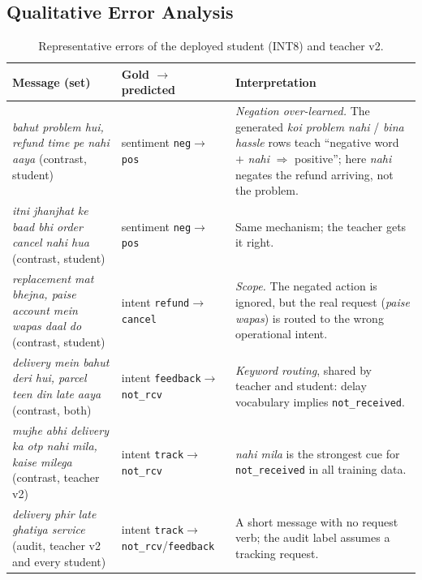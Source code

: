 \documentclass[11pt,a4paper]{article}
\theoremstyle{remark}
\newcommand{\lbl}[1]{\texttt{#1}}                      %
\newcommand{\hi}[1]{\textit{#1}}                       %
\begin{document}
\subsection{Qualitative Error Analysis}
\label{sec:v12errors}

\begin{table}[h]
\centering\small
\caption{Representative errors of the deployed student (INT8) and teacher v2.}
\label{tab:v12errors}
\begin{tabularx}{\linewidth}{@{}p{5.0cm} p{3.0cm} X@{}}
\toprule
Message (set) & Gold $\to$ predicted & Interpretation \\
\midrule
\hi{bahut problem hui, refund time pe nahi aaya} (contrast, student) &
sentiment \lbl{neg}$\to$\lbl{pos} &
\emph{Negation over-learned.} The generated \hi{koi problem nahi} / \hi{bina hassle} rows teach ``negative word $+$ \hi{nahi} $\Rightarrow$ positive''; here \hi{nahi} negates the refund arriving, not the problem. \\
\addlinespace
\hi{itni jhanjhat ke baad bhi order cancel nahi hua} (contrast, student) &
sentiment \lbl{neg}$\to$\lbl{pos} &
Same mechanism; the teacher gets it right. \\
\addlinespace
\hi{replacement mat bhejna, paise account mein wapas daal do} (contrast, student) &
intent \lbl{refund}$\to$\lbl{cancel} &
\emph{Scope.} The negated action is ignored, but the real request (\hi{paise wapas}) is routed to the wrong operational intent. \\
\addlinespace
\hi{delivery mein bahut deri hui, parcel teen din late aaya} (contrast, both) &
intent \lbl{feedback}$\to$\lbl{not\_rcv} &
\emph{Keyword routing}, shared by teacher and student: delay vocabulary implies \lbl{not\_received}. \\
\addlinespace
\hi{mujhe abhi delivery ka otp nahi mila, kaise milega} (contrast, teacher v2) &
intent \lbl{track}$\to$\lbl{not\_rcv} &
\hi{nahi mila} is the strongest cue for \lbl{not\_received} in all training data. \\
\addlinespace
\hi{delivery phir late ghatiya service} (audit, teacher v2 and every student) &
intent \lbl{track}$\to$\lbl{not\_rcv}/\lbl{feedback} &
A short message with no request verb; the audit label assumes a tracking request. \\
\bottomrule
\end{tabularx}
\end{table}

\end{document}
